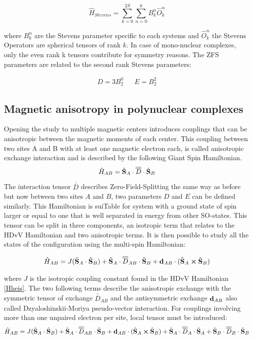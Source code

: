 \documentclass[10pt]{report}
\numberwithin{equation}{section}
\begin{document}
\begin{equation}
    \hat{H}_{Stevens}=\sum_{k=0}^{2S}\sum_{n=0}^{k}B_k^n\hat{O}_k^n
\end{equation}

where $B_k^n$ are the Stevens parameter specific to each systems and $\hat{O}_k^n$ the Stevens Operators are spherical tensors of rank $k$.
In case of mono-nuclear complexes, only the even rank k tensors contribute for symmetry reasons. 
The ZFS parameters are related to the second rank Stevens parameters:

\begin{align}
    D=3B_2^0 && E=B_2^2
\end{align}


\subsection{Magnetic anisotropy in polynuclear complexes}
Opening the study to multiple magnetic centers introduces couplings that can be anisotropic between the magnetic moments of each center. 
This coupling between two sites A and B with at least one magnetic electron each, is called anisotropic exchange interaction and is described by the following Giant Spin Hamiltonian.
\begin{equation}
    \hat{H}_{AB}=\hat{\vb S}_A\cdot \overline{\overline{D}} \cdot \hat{\vb S}_B
\end{equation}
The interaction tensor $\overline{\overline{D}}$ describes Zero-Field-Splitting the same way as before but now between two sites $A$ and $B$, two parameters $D$ and $E$ can be defined similarly. 
This Hamiltonian is suiTable for system with a ground state of spin larger or equal to one that is well separated in energy from other SO-states.
This tensor can be split in three components, an isotropic term that relates to the HDvV Hamiltonian and two anisotropic terms.
It is then possible to study all the states of the configuration using the multi-spin Hamiltonian:

\begin{equation}
    \hat{H}_{AB}=J(\hat{\vb S}_A \cdot \hat{\vb S}_B) + \hat{\vb S}_A \cdot\overline{\overline{D}}_{AB} \cdot \hat{\vb S}_B + \vb{d}_{AB} \cdot (\hat{\vb S}_A \cross \hat{\vb S}_B)
\end{equation}

\noindent where $J$ is the isotropic coupling constant found in the HDvV Hamiltonian \ref{Hheis}.
The two following terms describe the anisotropic exchange with the symmetric tensor of exchange $\overline{\overline{D}}_{AB}$ and the antisymmetric exchange $\vb{d}_{AB}$ also called Dzyaloshinskii-Moriya pseudo-vector interaction.
For couplings involving more than one unpaired electron per site, local tensor must be introduced:
\begin{equation}\label{HMS}
    \hat{H}_{AB}=J(\hat{\vb S}_A \cdot \hat{\vb S}_B) + \hat{\vb S}_A \cdot\overline{\overline{D}}_{AB} \cdot \hat{\vb S}_B + \vb{d}_{AB} \cdot (\hat{\vb S}_A \cross \hat{\vb S}_B) +\hat{\vb S}_A \cdot\overline{\overline{D}}_{A} \cdot \hat{\vb S}_A +\hat{\vb S}_B \cdot\overline{\overline{D}}_{B} \cdot \hat{\vb S}_B
\end{equation}
\end{document}
